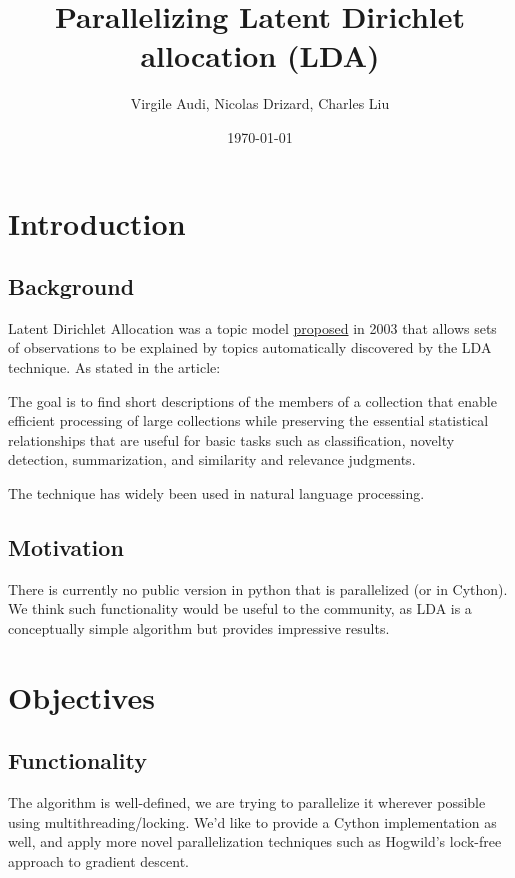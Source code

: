 \documentclass{article}
\title{Parallelizing Latent Dirichlet allocation (LDA)}
\author{Virgile Audi, Nicolas Drizard, Charles Liu}
\date{\today}
\begin{document}
 
\maketitle
 
\section{Introduction}
	\subsection{Background}
		Latent Dirichlet Allocation was a topic model \href{https://www.cs.princeton.edu/~blei/papers/BleiNgJordan2003.pdf}{proposed} in 2003 that allows sets of observations to be explained by topics automatically discovered by the LDA technique. As stated in the article:

		\begin{displayquote}
			The goal is to find short descriptions of the members of a collection that enable efficient
			processing of large collections while preserving the essential statistical relationships that are useful
			for basic tasks such as classification, novelty detection, summarization, and similarity and relevance
			judgments.
		\end{displayquote}

		The technique has widely been used in natural language processing.

	\subsection{Motivation}
		There is currently no public version in python that is parallelized (or in Cython). We think such functionality would be useful to the community, as LDA is a conceptually simple algorithm but provides impressive results.
 
\section{Objectives}
	\subsection{Functionality}
		The algorithm is well-defined, we are trying to parallelize it wherever possible using multithreading/locking. We'd like to provide a Cython implementation as well, and apply more novel parallelization techniques such as Hogwild's lock-free approach to gradient descent.
\end{document}

